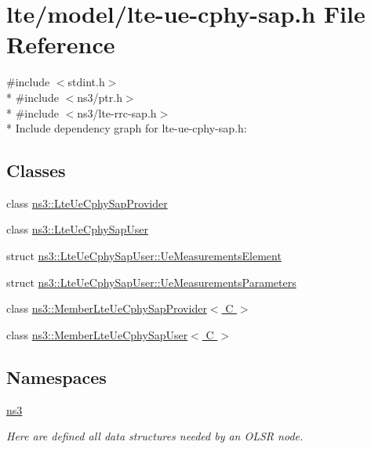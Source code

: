 \hypertarget{lte-ue-cphy-sap_8h}{}\section{lte/model/lte-\/ue-\/cphy-\/sap.h File Reference}
\label{lte-ue-cphy-sap_8h}
{\ttfamily \#include $<$stdint.\+h$>$}\\*
{\ttfamily \#include $<$ns3/ptr.\+h$>$}\\*
{\ttfamily \#include $<$ns3/lte-\/rrc-\/sap.\+h$>$}\\*
Include dependency graph for lte-\/ue-\/cphy-\/sap.h\+:
\subsection*{Classes}
\begin{DoxyCompactItemize}
\item 
class \hyperlink{classns3_1_1LteUeCphySapProvider}{ns3\+::\+Lte\+Ue\+Cphy\+Sap\+Provider}
\item 
class \hyperlink{classns3_1_1LteUeCphySapUser}{ns3\+::\+Lte\+Ue\+Cphy\+Sap\+User}
\item 
struct \hyperlink{structns3_1_1LteUeCphySapUser_1_1UeMeasurementsElement}{ns3\+::\+Lte\+Ue\+Cphy\+Sap\+User\+::\+Ue\+Measurements\+Element}
\item 
struct \hyperlink{structns3_1_1LteUeCphySapUser_1_1UeMeasurementsParameters}{ns3\+::\+Lte\+Ue\+Cphy\+Sap\+User\+::\+Ue\+Measurements\+Parameters}
\item 
class \hyperlink{classns3_1_1MemberLteUeCphySapProvider}{ns3\+::\+Member\+Lte\+Ue\+Cphy\+Sap\+Provider$<$ C $>$}
\item 
class \hyperlink{classns3_1_1MemberLteUeCphySapUser}{ns3\+::\+Member\+Lte\+Ue\+Cphy\+Sap\+User$<$ C $>$}
\end{DoxyCompactItemize}
\subsection*{Namespaces}
\begin{DoxyCompactItemize}
\item 
 \hyperlink{namespacens3}{ns3}
\begin{DoxyCompactList}\small\item\em Here are defined all data structures needed by an O\+L\+SR node. \end{DoxyCompactList}\end{DoxyCompactItemize}
